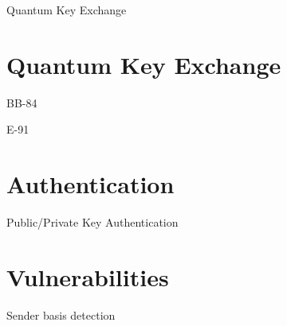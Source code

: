 \documentclass{beamer}
\begin{document}
	\begin{frame}{Quantum Key Exchange} %
		
	\end{frame}
	
	\section{Quantum Key Exchange}
	
	\begin{frame}{BB-84} %
		
	\end{frame}
	
	\begin{frame}{E-91} %
		
	\end{frame}
	
	\section{Authentication}
	
	\begin{frame}{Public/Private Key Authentication} %
		
	\end{frame}
	
	\section{Vulnerabilities}
	
	\begin{frame}{Sender basis detection} %
		
	\end{frame}
	

	\begin{frame}[plain]\end{frame}
	
\end{document}
